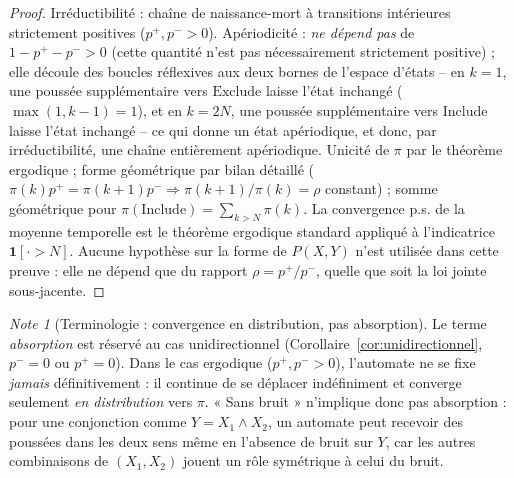 \documentclass[12pt,a4paper]{article}
\theoremstyle{remark}
\newtheorem{note}{Note}[section]
\newcommand{\Inc}{\ensuremath{\mathrm{Include}}}
\newcommand{\Exc}{\ensuremath{\mathrm{Exclude}}}
\begin{document}
\begin{proof}
Irréductibilité : chaîne de naissance-mort à transitions intérieures
strictement positives ($p^+,p^->0$). Apériodicité : \emph{ne dépend pas} de
$1-p^+-p^->0$ (cette quantité n'est pas nécessairement strictement positive) ;
elle découle des boucles réflexives aux deux bornes de l'espace d'états -- en
$k=1$, une poussée supplémentaire vers $\Exc$ laisse l'état inchangé
($\max(1,k-1)=1$), et en $k=2N$, une poussée supplémentaire vers $\Inc$ laisse
l'état inchangé -- ce qui donne un état apériodique, et donc, par
irréductibilité, une chaîne entièrement apériodique. Unicité de $\pi$ par le
théorème ergodique ; forme géométrique par bilan détaillé
($\pi(k)p^+=\pi(k{+}1)p^- \Rightarrow \pi(k{+}1)/\pi(k)=\rho$ constant) ;
somme géométrique pour $\pi(\Inc)=\sum_{k>N}\pi(k)$. La convergence p.s. de la
moyenne temporelle est le théorème ergodique standard appliqué à l'indicatrice
$\mathbf 1[\cdot>N]$. Aucune hypothèse sur la forme de $P(X,Y)$ n'est utilisée
dans cette preuve : elle ne dépend que du rapport $\rho=p^+/p^-$, quelle que
soit la loi jointe sous-jacente.
\end{proof}

\begin{note}[Terminologie : convergence en distribution, pas absorption]
Le terme \emph{absorption} est réservé au cas unidirectionnel
(Corollaire~\ref{cor:unidirectionnel}, $p^-=0$ ou $p^+=0$). Dans le cas
ergodique ($p^+,p^->0$), l'automate ne se fixe \emph{jamais} définitivement :
il continue de se déplacer indéfiniment et converge seulement \emph{en
distribution} vers $\pi$. « Sans bruit » n'implique donc pas absorption : pour
une conjonction comme $Y=X_1\wedge X_2$, un automate peut recevoir des
poussées dans les deux sens même en l'absence de bruit sur $Y$, car les autres
combinaisons de $(X_1,X_2)$ jouent un rôle symétrique à celui du bruit.
\end{note}
\end{document}
